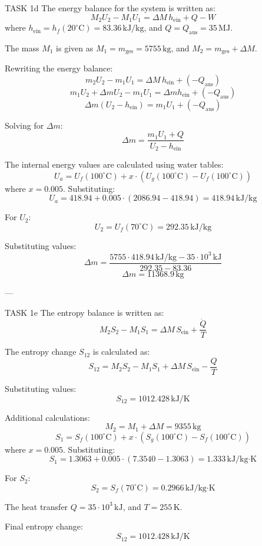 TASK 1d  
The energy balance for the system is written as:  
\[
M_2 U_2 - M_1 U_1 = \Delta M \, h_{\text{ein}} + Q - W
\]  
where \( h_{\text{ein}} = h_f(20^\circ\text{C}) = 83.36 \, \text{kJ/kg} \), and \( Q = Q_{\text{aus}} = 35 \, \text{MJ} \).  

The mass \( M_1 \) is given as \( M_1 = m_{\text{ges}} = 5755 \, \text{kg} \), and \( M_2 = m_{\text{ges}} + \Delta M \).  

Rewriting the energy balance:  
\[
m_2 U_2 - m_1 U_1 = \Delta M \, h_{\text{ein}} + (-Q_{\text{aus}})
\]  
\[
m_1 U_2 + \Delta m U_2 - m_1 U_1 = \Delta m h_{\text{ein}} + (-Q_{\text{aus}})
\]  
\[
\Delta m (U_2 - h_{\text{ein}}) = m_1 U_1 + (-Q_{\text{aus}})
\]  

Solving for \( \Delta m \):  
\[
\Delta m = \frac{m_1 U_1 + Q}{U_2 - h_{\text{ein}}}
\]  

The internal energy values are calculated using water tables:  
\[
U_a = U_f(100^\circ\text{C}) + x \cdot (U_g(100^\circ\text{C}) - U_f(100^\circ\text{C}))
\]  
where \( x = 0.005 \). Substituting:  
\[
U_a = 418.94 + 0.005 \cdot (2086.94 - 418.94) = 418.94 \, \text{kJ/kg}
\]  

For \( U_2 \):  
\[
U_2 = U_f(70^\circ\text{C}) = 292.35 \, \text{kJ/kg}
\]  

Substituting values:  
\[
\Delta m = \frac{5755 \cdot 418.94 \, \text{kJ/kg} - 35 \cdot 10^3 \, \text{kJ}}{292.35 - 83.36}
\]  
\[
\Delta m = 11368.9 \, \text{kg}
\]  

---

TASK 1e  
The entropy balance is written as:  
\[
M_2 S_2 - M_1 S_1 = \Delta M \, S_{\text{ein}} + \frac{\dot{Q}}{T}
\]  

The entropy change \( S_{12} \) is calculated as:  
\[
S_{12} = M_2 S_2 - M_1 S_1 + \Delta M \, S_{\text{ein}} - \frac{Q}{T}
\]  

Substituting values:  
\[
S_{12} = 1012.428 \, \text{kJ/K}
\]  

Additional calculations:  
\[
M_2 = M_1 + \Delta M = 9355 \, \text{kg}
\]  
\[
S_1 = S_f(100^\circ\text{C}) + x \cdot (S_g(100^\circ\text{C}) - S_f(100^\circ\text{C}))
\]  
where \( x = 0.005 \). Substituting:  
\[
S_1 = 1.3063 + 0.005 \cdot (7.3540 - 1.3063) = 1.333 \, \text{kJ/kg·K}
\]  

For \( S_2 \):  
\[
S_2 = S_f(70^\circ\text{C}) = 0.2966 \, \text{kJ/kg·K}
\]  

The heat transfer \( Q = 35 \cdot 10^3 \, \text{kJ} \), and \( T = 255 \, \text{K} \).  

Final entropy change:  
\[
S_{12} = 1012.428 \, \text{kJ/K}
\]